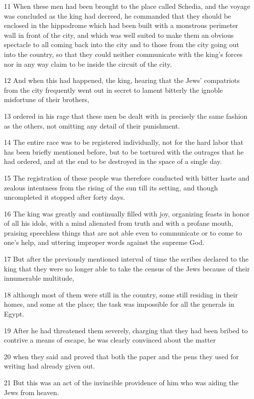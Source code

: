\par 11 When these men had been brought to the place called Schedia, and the voyage was concluded as the king had decreed, he commanded that they should be enclosed in the hippodrome which had been built with a monstrous perimeter wall in front of the city, and which was well suited to make them an obvious spectacle to all coming back into the city and to those from the city going out into the country, so that they could neither communicate with the king's forces nor in any way claim to be inside the circuit of the city.
\par 12 And when this had happened, the king, hearing that the Jews' compatriots from the city frequently went out in secret to lament bitterly the ignoble misfortune of their brothers,
\par 13 ordered in his rage that these men be dealt with in precisely the same fashion as the others, not omitting any detail of their punishment.
\par 14 The entire race was to be registered individually, not for the hard labor that has been briefly mentioned before, but to be tortured with the outrages that he had ordered, and at the end to be destroyed in the space of a single day.
\par 15 The registration of these people was therefore conducted with bitter haste and zealous intentness from the rising of the sun till its setting, and though uncompleted it stopped after forty days.
\par 16 The king was greatly and continually filled with joy, organizing feasts in honor of all his idols, with a mind alienated from truth and with a profane mouth, praising speechless things that are not able even to communicate or to come to one's help, and uttering improper words against the supreme God.
\par 17 But after the previously mentioned interval of time the scribes declared to the king that they were no longer able to take the census of the Jews because of their innumerable multitude,
\par 18 although most of them were still in the country, some still residing in their homes, and some at the place; the task was impossible for all the generals in Egypt.
\par 19 After he had threatened them severely, charging that they had been bribed to contrive a means of escape, he was clearly convinced about the matter
\par 20 when they said and proved that both the paper and the pens they used for writing had already given out.
\par 21 But this was an act of the invincible providence of him who was aiding the Jews from heaven.

